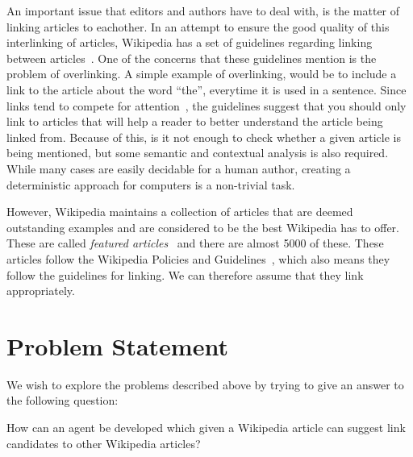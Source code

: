 An important issue that editors and authors have to deal with, is the matter of linking articles to eachother. In an attempt to ensure the good quality of this interlinking of articles, Wikipedia has a set of guidelines regarding linking between articles~\cite{wiki-manual-of-style-overlinking}. 
One of the concerns that these guidelines mention is the problem of overlinking. A simple example of overlinking, would be to include a link to the article about the word \enquote{the}, everytime it is used in a sentence. Since links tend to compete for attention~\cite{hyperlink-structure-using-logs}, the guidelines suggest that you should only link to articles that will help a reader to better understand the article being linked from. Because of this, is it not enough to check whether a given article is being mentioned, but some semantic and contextual analysis is also required. While many cases are easily decidable for a human author, creating a deterministic approach for computers is a non-trivial task.

However, Wikipedia maintains a collection of articles that are deemed outstanding examples and are considered to be the best Wikipedia has to offer. These are called \emph{featured articles}~\cite{wiki-featured-articles} and there are almost 5000 of these. These articles follow the Wikipedia Policies and Guidelines~\cite{wiki-editor-guidelines}, which also means they follow the guidelines for linking. We can therefore assume that they link appropriately.


\section{Problem Statement}

We wish to explore the problems described above by trying to give an answer to the following question:

\begin{formal}
How can an agent be developed which given a Wikipedia article can suggest link candidates to other Wikipedia articles?
\end{formal}

